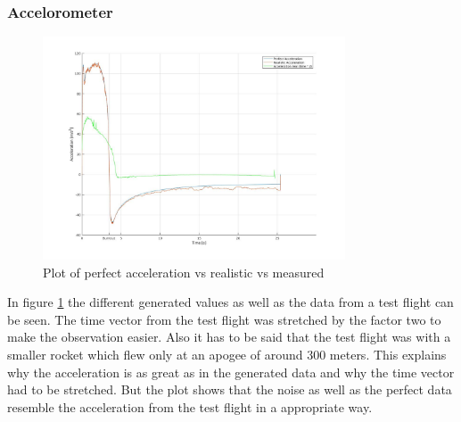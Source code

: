 \subsubsection{Accelorometer}
\begin{figure}[h!]
 \centering
 \includegraphics[width=0.8\textwidth]{./Pictures/AccelPerfVSReal.jpg}
 \caption{Plot of perfect acceleration vs realistic vs measured}
 \label{fig:AccelPerfVsReal}
\end{figure}
In figure \ref{fig:AccelPerfVsReal} the different generated values as well as the data from a test flight can be seen.
The time vector from the test flight was stretched by the factor two to make the observation easier.
Also it has to be said that the test flight was with a smaller rocket which flew only at an apogee of around 300 meters.
This explains why the acceleration is as great as in the generated data and why the time vector had to be stretched.
But the plot shows that the noise as well as the perfect data resemble the acceleration from the test flight in a appropriate way.

\newpage
